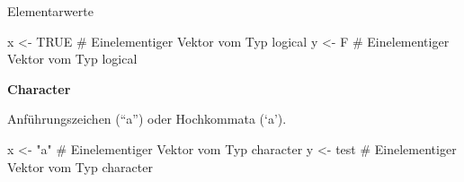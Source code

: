 \documentclass[
  8pt,
  ignorenonframetext,
]{beamer}
\newenvironment{Shaded}{\begin{snugshade}}{\end{snugshade}}
\newcommand{\CommentTok}[1]{\textcolor[rgb]{0.37,0.37,0.37}{#1}}
\newcommand{\ConstantTok}[1]{\textcolor[rgb]{0.56,0.35,0.01}{#1}}
\newcommand{\NormalTok}[1]{\textcolor[rgb]{0.00,0.23,0.31}{#1}}
\newcommand{\OtherTok}[1]{\textcolor[rgb]{0.00,0.23,0.31}{#1}}
\newcommand{\StringTok}[1]{\textcolor[rgb]{0.13,0.47,0.30}{#1}}
\begin{document}
\begin{frame}[fragile]{Elementarwerte}
\begin{Shaded}
\begin{Highlighting}[]
\NormalTok{x }\OtherTok{\textless{}{-}} \ConstantTok{TRUE}                 \CommentTok{\# Einelementiger Vektor vom Typ logical}
\NormalTok{y }\OtherTok{\textless{}{-}}\NormalTok{ F                    }\CommentTok{\# Einelementiger Vektor vom Typ logical}
\end{Highlighting}
\end{Shaded}

\small

\textbf{Character}

\footnotesize

Anführungszeichen (``a'') oder Hochkommata (`a'). \vspace{1mm} \tiny

\begin{Shaded}
\begin{Highlighting}[]
\NormalTok{x }\OtherTok{\textless{}{-}} \StringTok{"a"}                  \CommentTok{\# Einelementiger Vektor vom Typ character}
\NormalTok{y }\OtherTok{\textless{}{-}} \StringTok{\textquotesingle{}test\textquotesingle{}}               \CommentTok{\# Einelementiger Vektor vom Typ character}
\end{Highlighting}
\end{Shaded}
\end{frame}
\end{document}
